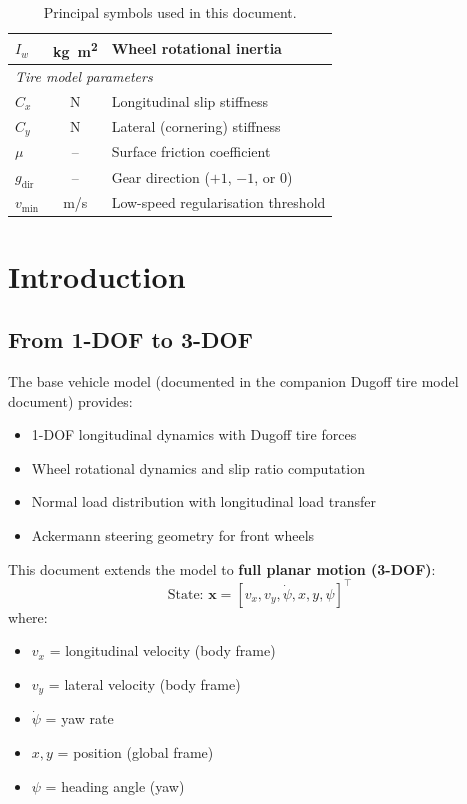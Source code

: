 \documentclass[11pt,a4paper]{article}
\begin{document}
\begin{table}[H]
\begin{tabular}{lcl}
$I_w$            & \si{kg.m^2}  & Wheel rotational inertia \\
\midrule
\multicolumn{3}{l}{\textit{Tire model parameters}} \\
$C_x$            & \si{N}       & Longitudinal slip stiffness \\
$C_y$            & \si{N}       & Lateral (cornering) stiffness \\
$\mu$            & --           & Surface friction coefficient \\
$g_{\text{dir}}$ & --           & Gear direction ($+1$, $-1$, or $0$) \\
$v_{\min}$       & \si{m/s}     & Low-speed regularisation threshold \\
\bottomrule
\end{tabular}
\caption{Principal symbols used in this document.}
\end{table}

\clearpage

\section{Introduction}

\subsection{From 1-DOF to 3-DOF}

The base vehicle model (documented in the companion Dugoff tire model document) provides:
\begin{itemize}
    \item 1-DOF longitudinal dynamics with Dugoff tire forces
    \item Wheel rotational dynamics and slip ratio computation
    \item Normal load distribution with longitudinal load transfer
    \item Ackermann steering geometry for front wheels
\end{itemize}

This document extends the model to \textbf{full planar motion (3-DOF)}:
\begin{equation}
\text{State: } \bm{x} = [v_x, v_y, \dot{\psi}, x, y, \psi]^\top
\end{equation}
where:
\begin{itemize}
    \item $v_x$ = longitudinal velocity (body frame)
    \item $v_y$ = lateral velocity (body frame)
    \item $\dot{\psi}$ = yaw rate
    \item $x, y$ = position (global frame)
    \item $\psi$ = heading angle (yaw)
\end{itemize}
\end{document}
